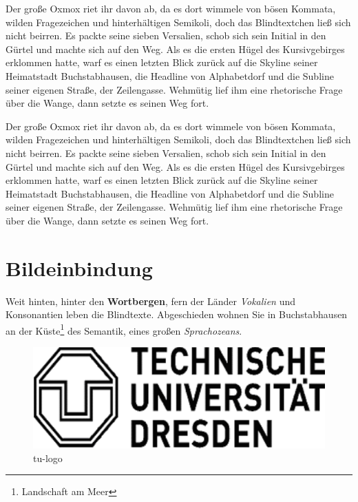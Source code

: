 \documentclass[%
	12pt,%
	a4paper,%
	oneside,%
	listof=totoc,
 	index=totoc,
	bibliography = totoc,
	parskip = half,%
	chapterprefix=false,%
	appendixprefix, %
headings=small,%
]{scrreprt}
\newcommand{\alt}[1]{}%
\begin{document}
Der große Oxmox riet ihr davon ab, da es dort wimmele von bösen Kommata, wilden Fragezeichen und hinterhältigen Semikoli, doch das Blindtextchen ließ sich nicht beirren. Es packte seine sieben Versalien, schob sich sein Initial in den Gürtel und machte sich auf den Weg. Als es die ersten Hügel des Kursivgebirges erklommen hatte, warf es einen letzten Blick zurück auf die Skyline seiner Heimatstadt Buchstabhausen, die Headline von Alphabetdorf und die Subline seiner eigenen Straße, der Zeilengasse. Wehmütig lief ihm eine rhetorische Frage über die Wange, dann setzte es seinen Weg fort.

Der große Oxmox riet ihr davon ab, da es dort wimmele von bösen Kommata, wilden Fragezeichen und hinterhältigen Semikoli, doch das Blindtextchen ließ sich nicht beirren. Es packte seine sieben Versalien, schob sich sein Initial in den Gürtel und machte sich auf den Weg. Als es die ersten Hügel des Kursivgebirges erklommen hatte, warf es einen letzten Blick zurück auf die Skyline seiner Heimatstadt Buchstabhausen, die Headline von Alphabetdorf und die Subline seiner eigenen Straße, der Zeilengasse. Wehmütig lief ihm eine rhetorische Frage über die Wange, dann setzte es seinen Weg fort.


\chapter{Bildeinbindung}
\label{sec:Bilder}

Weit hinten, hinter den \textbf{Wortbergen}, fern der Länder \textit{Vokalien} und Konsonantien leben die Blindtexte. Abgeschieden wohnen Sie in Buchstabhausen an der Küste\footnote{Landschaft am Meer}
des Semantik, eines großen \textsl{Sprachozeans}. %

\begin{figure}[htbp] 
		\centering
		\alt{Ich bin das Logo der Technischen Universität Dresden}
		\includegraphics[scale=0.50]{images/tu_logo}%
	\caption{tu-logo}%
	\label{fig:tulogo}
\end{figure}
\end{document}
